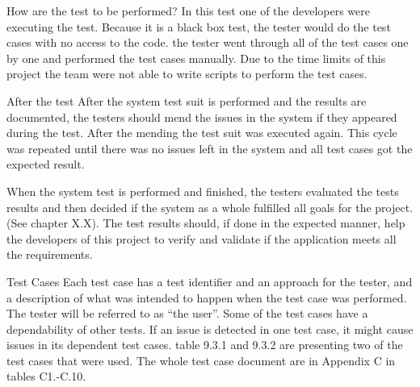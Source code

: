 How are the test to be performed? \newline
In this test one of the developers were executing the test. Because it is a black box test, the tester would do the test cases with no access to the code. the tester went through all of the test cases one by one and performed the test cases manually. Due to the time limits of this project the team were not able to write scripts to perform the test cases. \newline

After the test\newline
After the system test suit is performed and the results are documented, the testers should mend the issues in the system if they appeared during the test. After the mending the test suit was executed again. This cycle was repeated until there was no issues left in the system and all test cases got the expected result.\newline

When the system test is performed and finished, the testers evaluated the tests results and then decided if the system as a whole fulfilled all goals for the project.(See chapter X.X). The test results should, if done in the expected manner, help the developers of this project to verify and validate if the application meets all the requirements.\newline

Test Cases \newline
Each test case has a test identifier and an approach for the tester, and a description of what was intended to happen when the test case was performed. The tester will be referred to as “the user”. Some of the test cases have a dependability of other tests. If an issue is detected in one test case, it might cause issues in its dependent test cases. table 9.3.1 and 9.3.2 are presenting two of the test cases that were used. The whole test case document are in Appendix C in tables C1.-C.10. 

